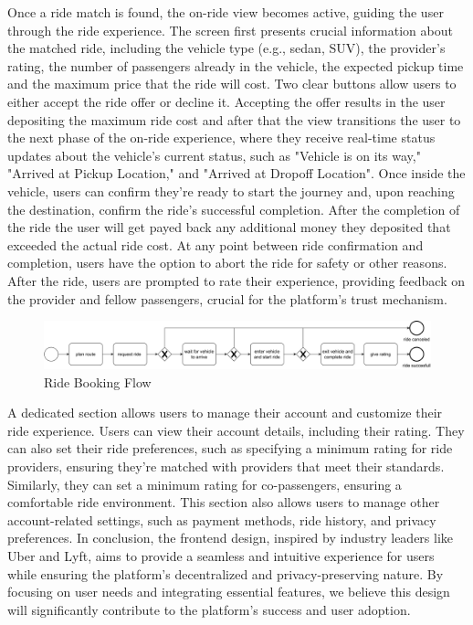 Once a ride match is found, the on-ride view becomes active, guiding the user through the ride experience. The screen first presents crucial information about the matched ride, including the vehicle type (e.g., sedan, SUV), the provider's rating, the number of passengers already in the vehicle, the expected pickup time and the maximum price that the ride will cost. Two clear buttons allow users to either accept the ride offer or decline it. Accepting the offer results in the user depositing the maximum ride cost and after that the view  transitions the user to the next phase of the on-ride experience, where they receive real-time status updates about the vehicle's current status, such as "Vehicle is on its way," "Arrived at Pickup Location," and "Arrived at Dropoff Location". Once inside the vehicle, users can confirm they're ready to start the journey and, upon reaching the destination, confirm the ride's successful completion. After the completion of the ride the user will get payed back any additional money they deposited that exceeded the actual ride cost. At any point between ride confirmation and completion, users have the option to abort the ride for safety or other reasons. After the ride, users are prompted to rate their experience, providing feedback on the provider and fellow passengers, crucial for the platform's trust mechanism.

\begin{figure}[h]
    \centering
    \includegraphics[width=\linewidth]{data/3.svg}
    \caption{Ride Booking Flow}
    \label{fig:directSVG}
\end{figure}

A dedicated section allows users to manage their account and customize their ride experience. Users can view their account details, including their rating. They can also set their ride preferences, such as specifying a minimum rating for ride providers, ensuring they're matched with providers that meet their standards. Similarly, they can set a minimum rating for co-passengers, ensuring a comfortable ride environment. This section also allows users to manage other account-related settings, such as payment methods, ride history, and privacy preferences. In conclusion, the frontend design, inspired by industry leaders like Uber and Lyft, aims to provide a seamless and intuitive experience for users while ensuring the platform's decentralized and privacy-preserving nature. By focusing on user needs and integrating essential features, we believe this design will significantly contribute to the platform's success and user adoption.


